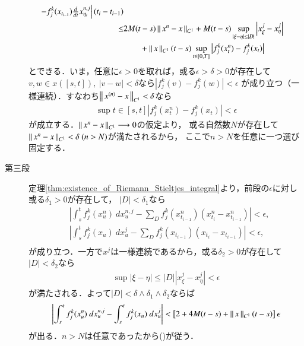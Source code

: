 \begin{prf}
\begin{description}
\begin{align}
					\left. - f^k_j(x_{t_{i-1}}) \tfrac{d}{dt}x^{n,j}_{\eta_i} \right|(t_i - t_{i-1}) \\
				\leq &2M (t - s) \left\|\, x^n - x\, \right\|_{C^1}
					+ M(t-s) \operatorname*{sup}_{|\xi - \eta| \leq |D|} \left|x^j_\xi - x^j_\eta \right| \\
					&\qquad + \left\|\, x\, \right\|_{C^1}(t-s)\operatorname*{sup}_{t \in [0,T]} \left|f^k_j(x^n_t) - f^k_j(x_t) \right|
			\end{align}
			とできる．いま，任意に$\epsilon > 0$を取れば，或る$\epsilon > \delta > 0$が存在して
			$v,w \in x([s,t]),\ |v - w| < \delta$なら$|f^k_j(v) - f^k_j(w)| < \epsilon$
			が成り立つ（一様連続）．すなわち$\left\|\, x^{(n)} - x\, \right\|_{C^1} < \delta$なら
			\begin{align}
				\sup{t \in [s,t]}{\left|f^k_j(x^n_t) - f^k_j(x_t) \right|} < \epsilon
			\end{align}
			が成立する．$\left\|\, x^n - x\, \right\|_{C^1} \longrightarrow 0$の仮定より，
			或る自然数$N$が存在して$\left\|\, x^n - x\, \right\|_{C^1} < \delta\ (n > N)$が満たされるから，
			ここで$n > N$を任意に一つ選び固定する．
		
		\item[第三段] 定理\ref{thm:existence_of_Riemann_Stieltjes_integral}より，前段の$\epsilon$に対し或る$\delta_1 > 0$が存在して，
			$|D| < \delta_1$なら
			\begin{align}
				&\left| \int_s^t f^k_j(x^n_u)\ dx^{n,j}_u
					- \sum_D f^k_j(x^n_{t_{i-1}})(x^n_{t_i} - x^n_{t_{i-1}}) \right| < \epsilon, \\
				&\left| \int_s^t f^k_j(x_u)\ dx^j_u
					- \sum_D f^k_j(x_{t_{i-1}})(x_{t_i} - x_{t_{i-1}}) \right| < \epsilon, \\
			\end{align}
			が成り立つ．一方で$x^j$は一様連続であるから，或る$\delta_2 > 0$が存在して
			$|D| < \delta_2$なら
			\begin{align}
				\sup{|\xi - \eta| \leq |D|}{\left|x^j_\xi - x^j_\eta \right|} < \epsilon
			\end{align}
			が満たされる．よって$|D| < \delta \wedge \delta_1 \wedge \delta_2$ならば
			\begin{align}
				\left| \int_s^t f^k_j(x^n_u)\ dx^{n,j}_u
					- \int_s^t f^k_j(x_u)\ dx^j_u \right|
				< \left[2 + 4M(t-s) + \left\|\, x\, \right\|_{C^1}(t-s) \right] \epsilon
			\end{align}
			が出る．$n > N$は任意であったから()が従う．
			\QED
	\end{description}
\end{prf}

